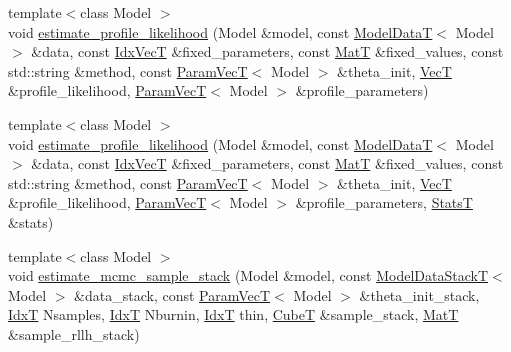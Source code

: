 \begin{DoxyCompactItemize}
\item 
{\footnotesize template$<$class Model $>$ }\\void \hyperlink{namespacemappel_1_1methods_1_1openmp_a190af7ff01303344aeeb71628f8c9558}{estimate\+\_\+profile\+\_\+likelihood} (Model \&model, const \hyperlink{namespacemappel_a97f050df953605381ae9c901c3b125f1}{Model\+DataT}$<$ Model $>$ \&data, const \hyperlink{namespacemappel_ac63743dcd42180127307cd0e4ecdd784}{Idx\+VecT} \&fixed\+\_\+parameters, const \hyperlink{namespacemappel_a7091ab87c528041f7e2027195fad8915}{MatT} \&fixed\+\_\+values, const std\+::string \&method, const \hyperlink{namespacemappel_a0f86d3153e4e27b095012f140eea58de}{Param\+VecT}$<$ Model $>$ \&theta\+\_\+init, \hyperlink{namespacemappel_a2225ad69f358daa3f4f99282a35b9a3a}{VecT} \&profile\+\_\+likelihood, \hyperlink{namespacemappel_a0f86d3153e4e27b095012f140eea58de}{Param\+VecT}$<$ Model $>$ \&profile\+\_\+parameters)
\item 
{\footnotesize template$<$class Model $>$ }\\void \hyperlink{namespacemappel_1_1methods_1_1openmp_ad47b336b7f0dd9f65e995ad4c035cc19}{estimate\+\_\+profile\+\_\+likelihood} (Model \&model, const \hyperlink{namespacemappel_a97f050df953605381ae9c901c3b125f1}{Model\+DataT}$<$ Model $>$ \&data, const \hyperlink{namespacemappel_ac63743dcd42180127307cd0e4ecdd784}{Idx\+VecT} \&fixed\+\_\+parameters, const \hyperlink{namespacemappel_a7091ab87c528041f7e2027195fad8915}{MatT} \&fixed\+\_\+values, const std\+::string \&method, const \hyperlink{namespacemappel_a0f86d3153e4e27b095012f140eea58de}{Param\+VecT}$<$ Model $>$ \&theta\+\_\+init, \hyperlink{namespacemappel_a2225ad69f358daa3f4f99282a35b9a3a}{VecT} \&profile\+\_\+likelihood, \hyperlink{namespacemappel_a0f86d3153e4e27b095012f140eea58de}{Param\+VecT}$<$ Model $>$ \&profile\+\_\+parameters, \hyperlink{namespacemappel_a04ab395b0cf82c4ce68a36b2212649a5}{StatsT} \&stats)
\item 
{\footnotesize template$<$class Model $>$ }\\void \hyperlink{namespacemappel_1_1methods_1_1openmp_aa09c0723739ee5b65f44f2570289cfa6}{estimate\+\_\+mcmc\+\_\+sample\+\_\+stack} (Model \&model, const \hyperlink{namespacemappel_aaeb6665bc57476dd93c2df6ad8bc4768}{Model\+Data\+StackT}$<$ Model $>$ \&data\+\_\+stack, const \hyperlink{namespacemappel_a0f86d3153e4e27b095012f140eea58de}{Param\+VecT}$<$ Model $>$ \&theta\+\_\+init\+\_\+stack, \hyperlink{namespacemappel_ab17ec0f30b61ece292439d7ece81d3a8}{IdxT} Nsamples, \hyperlink{namespacemappel_ab17ec0f30b61ece292439d7ece81d3a8}{IdxT} Nburnin, \hyperlink{namespacemappel_ab17ec0f30b61ece292439d7ece81d3a8}{IdxT} thin, \hyperlink{namespacemappel_ab2afab4e6c8805e83946670d882768c2}{CubeT} \&sample\+\_\+stack, \hyperlink{namespacemappel_a7091ab87c528041f7e2027195fad8915}{MatT} \&sample\+\_\+rllh\+\_\+stack)

\end{DoxyCompactItemize}
